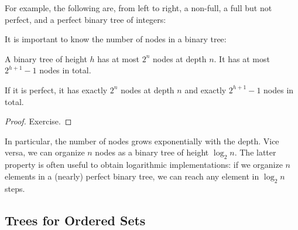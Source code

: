 For example, the following are, from left to right, a non-full, a full but not perfect, and a perfect binary tree of integers:
\begin{center}
\tb\tb
{}
\tb\tb
{}
\end{center}


It is important to know the number of nodes in a binary tree:

\begin{theorem}\label{thm:ad:bintree}
A binary tree of height $h$ has at most $2^n$ nodes at depth $n$.
It has at most $2^{h+1}-1$ nodes in total.

If it is perfect, it has exactly $2^n$ nodes at depth $n$ and exactly $2^{h+1}-1$ nodes in total.
\end{theorem}
\begin{proof}
Exercise.
\end{proof}

In particular, the number of nodes grows exponentially with the depth.
Vice versa, we can organize $n$ nodes as a binary tree of height $\log_2 n$.
The latter property is often useful to obtain logarithmic implementations: if we organize $n$ elements in a (nearly) perfect binary tree, we can reach any element in $\log_2 n$ steps.

\subsection{Trees for Ordered Sets}

